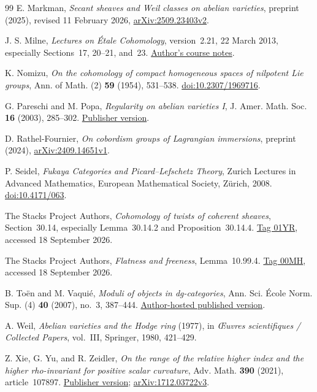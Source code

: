 \documentclass[11pt]{article}
\theoremstyle{definition}
\theoremstyle{remark}
\numberwithin{equation}{section}
\begin{document}
\begin{thebibliography}{99}
E. Markman,
\emph{Secant sheaves and Weil classes on abelian varieties},
preprint (2025), revised 11 February 2026,
\href{https://arxiv.org/abs/2509.23403v2}{arXiv:2509.23403v2}.

J. S. Milne,
\emph{Lectures on \'Etale Cohomology}, version~2.21, 22 March 2013,
especially Sections~17, 20--21, and~23.
\href{https://www.jmilne.org/math/CourseNotes/LEC.pdf}{Author's course notes}.

K. Nomizu,
\emph{On the cohomology of compact homogeneous spaces of nilpotent Lie groups},
Ann. of Math. (2) \textbf{59} (1954), 531--538.
\href{https://doi.org/10.2307/1969716}{doi:10.2307/1969716}.

G. Pareschi and M. Popa,
\emph{Regularity on abelian varieties I},
J. Amer. Math. Soc. \textbf{16} (2003), 285--302.
\href{https://doi.org/10.1090/S0894-0347-02-00414-9}{Publisher version}.

D. Rathel-Fournier,
\emph{On cobordism groups of Lagrangian immersions},
preprint (2024), \href{https://arxiv.org/abs/2409.14651v1}{arXiv:2409.14651v1}.

P. Seidel,
\emph{Fukaya Categories and Picard--Lefschetz Theory},
Zurich Lectures in Advanced Mathematics,
European Mathematical Society, Z\"urich, 2008.
\href{https://doi.org/10.4171/063}{doi:10.4171/063}.

The Stacks Project Authors,
\emph{Cohomology of twists of coherent sheaves},
Section~30.14, especially Lemma~30.14.2 and Proposition~30.14.4.
\href{https://stacks.math.columbia.edu/tag/01YR}{Tag 01YR},
accessed 18 September 2026.

The Stacks Project Authors,
\emph{Flatness and freeness}, Lemma~10.99.4.
\href{https://stacks.math.columbia.edu/tag/00MH}{Tag 00MH},
accessed 18 September 2026.

B. To\"en and M. Vaqui\'e,
\emph{Moduli of objects in dg-categories},
Ann. Sci. \'Ecole Norm. Sup. (4) \textbf{40} (2007), no.~3, 387--444.
\href{https://www.math.univ-toulouse.fr/~vaquie/marque/vaquie_AnnEns40.pdf}
{Author-hosted published version}.

A. Weil,
\emph{Abelian varieties and the Hodge ring} (1977),
in \emph{\OE uvres scientifiques / Collected Papers}, vol.~III,
Springer, 1980, 421--429.

Z. Xie, G. Yu, and R. Zeidler,
\emph{On the range of the relative higher index and the higher
rho-invariant for positive scalar curvature},
Adv. Math. \textbf{390} (2021), article~107897.
\href{https://doi.org/10.1016/j.aim.2021.107897}{Publisher version};
\href{https://arxiv.org/abs/1712.03722v3}{arXiv:1712.03722v3}.

\end{thebibliography}
\end{document}
